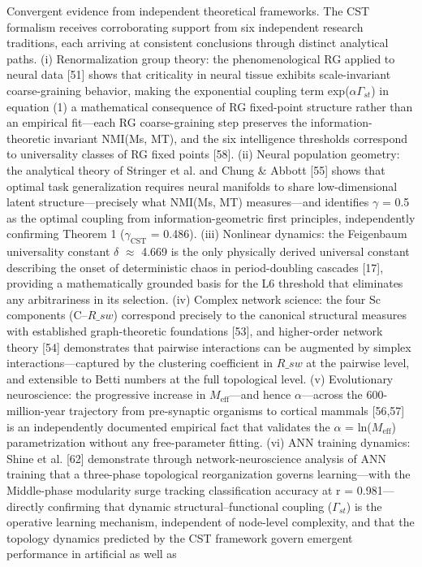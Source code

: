 \documentclass[a4paper,12pt]{article}
\begin{document}
Convergent evidence from independent theoretical frameworks.
The CST formalism receives corroborating support from six independent research traditions, each arriving at consistent conclusions through distinct analytical paths. (i) Renormalization group theory: the phenomenological RG applied to neural data [51] shows that criticality in neural tissue exhibits scale-invariant coarse-graining behavior, making the exponential coupling term
exp($\alpha$\cdot$\Gamma_{st}$) in equation (1) a mathematical consequence of RG fixed-point structure rather than an empirical fit---each RG coarse-graining step preserves the information-theoretic invariant NMI(Ms, MT), and the six intelligence thresholds correspond to universality classes of RG fixed points [58]. (ii) Neural population geometry: the analytical theory of Stringer et al. and
Chung \& Abbott [55] shows that optimal task generalization requires neural manifolds to share low-dimensional latent structure---precisely what NMI(Ms, MT) measures---and identifies $\gamma$ = 0.5 as the optimal coupling from information-geometric first principles, independently confirming Theorem 1 ($\gamma_{\text{CST}}$ = 0.486). (iii) Nonlinear dynamics: the Feigenbaum universality constant $\delta$
$\approx$ 4.669 is the only physically derived universal constant describing the onset of deterministic chaos in period-doubling cascades [17], providing a mathematically grounded basis for the L6 threshold that eliminates any arbitrariness in its selection. (iv) Complex network science: the four Sc components (C--$R\_{sw}$) correspond precisely to the canonical structural measures with
established graph-theoretic foundations [53], and higher-order network theory [54] demonstrates that pairwise interactions can be augmented by simplex interactions---captured by the clustering coefficient in $R\_{sw}$ at the pairwise level, and extensible to Betti numbers at the full topological level. (v) Evolutionary neuroscience: the progressive increase in $M_{\text{eff}}$---and hence
$\alpha$---across the 600-million-year trajectory from pre-synaptic organisms to cortical mammals [56,57] is an independently documented empirical fact that validates the $\alpha$ = ln($M_{\text{eff}}$) parametrization without any free-parameter fitting. (vi) ANN training dynamics: Shine et al. [62] demonstrate through network-neuroscience analysis of ANN training that a three-phase topological
reorganization governs learning---with the Middle-phase modularity surge tracking classification accuracy at r = 0.981---directly confirming that dynamic structural--functional coupling ($\Gamma_{st}$) is the operative learning mechanism, independent of node-level complexity, and that the topology dynamics predicted by the CST framework govern emergent performance in artificial as well as
\end{document}
